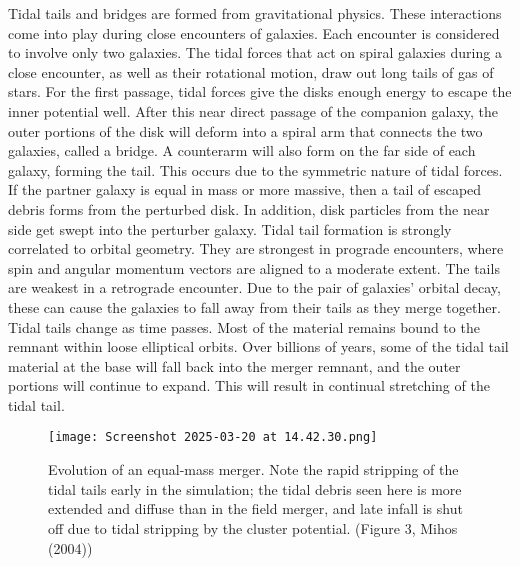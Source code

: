 \documentclass[fleqn,usenatbib]{mnras}
\begin{document}
Tidal tails and bridges are formed from gravitational physics. These interactions come into play during close encounters of galaxies. Each encounter is considered to involve only two galaxies. The tidal forces that act on spiral galaxies during a close encounter, as well as their rotational motion, draw out long tails of gas of stars. For the first passage, tidal forces give the disks enough energy to escape the inner potential well.\cite{Mihos_2004}
After this near direct passage of the companion galaxy, the outer portions of the disk will deform into a spiral arm that connects the two galaxies, called a bridge. A counterarm will also form on the far side of each galaxy, forming the tail. This occurs due to the symmetric nature of tidal forces. If the partner galaxy is equal in mass or more massive, then a tail of escaped debris forms from the perturbed disk. In addition, disk particles from the near side get swept into the perturber galaxy. \cite{Toomre_Toomre_1972}  
Tidal tail formation is strongly correlated to orbital geometry. \cite{Mihos_2004} They are strongest in prograde encounters, where spin and angular momentum vectors are aligned to a moderate extent. The tails are weakest in a retrograde encounter. Due to the pair of galaxies' orbital decay, these can cause the galaxies to fall away from their tails as they merge together.
Tidal tails change as time passes. Most of the material remains bound to the remnant within loose elliptical orbits. Over billions of years, some of the tidal tail material at the base will fall back into the merger remnant, and the outer portions will continue to expand. This will result in continual stretching of the tidal tail. \cite{Mihos_2004}


\begin{figure}
    \centering
    \texttt{[image: Screenshot 2025-03-20 at 14.42.30.png]}
    \caption{Evolution of an equal-mass merger. Note the rapid stripping of the tidal tails early in the simulation; the tidal debris seen here is more extended and diﬀuse than in the field merger, and late infall is shut oﬀ due to tidal stripping by the cluster potential. (Figure 3, Mihos (2004))
}
    \label{fig:enter-label}
\end{figure}
\end{document}
